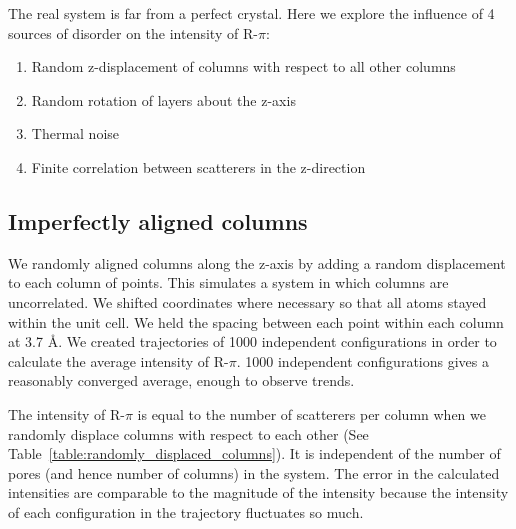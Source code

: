 \documentclass{article}
\begin{document}
  The real system is far from a perfect crystal. Here we explore the influence
  of 4 sources of disorder on the intensity of R-$\pi$:
  \begin{enumerate}
  \item Random z-displacement of columns with respect to all other columns
  \item Random rotation of layers about the z-axis
  \item Thermal noise
  \item Finite correlation between scatterers in the z-direction
  \end{enumerate}

  \subsection{Imperfectly aligned columns}

  We randomly aligned columns along the z-axis by adding a random displacement
  to each column of points. This simulates a system in which columns are
  uncorrelated.  We shifted coordinates where necessary so that all atoms stayed
  within the unit cell. We held the spacing between each point within each column
  at 3.7 \AA. We created trajectories of 1000 independent
  configurations in order to calculate the average intensity of R-$\pi$. 1000
  independent configurations gives a reasonably converged average, enough to
  observe trends.

  The intensity of R-$\pi$ is equal to the number of scatterers per
  column when we randomly displace columns with respect to each other (See
  Table~\ref{table:randomly_displaced_columns}).  It is independent of the
  number of pores (and hence number of columns) in the system. The error 
  in the calculated intensities are comparable to the magnitude of the 
  intensity because the intensity of each configuration in the trajectory
  fluctuates so much. 
\end{document}
